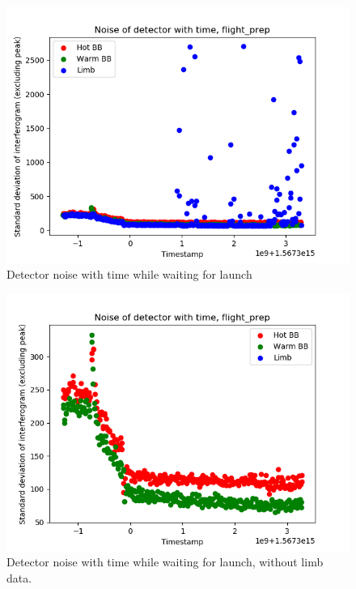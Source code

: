 \begin{figure}
\centering
  \includegraphics[width=0.8\linewidth]{mct_noise_temp_plots/flight_prep_noisevstime_colours.png}
  \caption{Detector noise with time while waiting for launch}
  \label{fig:flightpreptime_noise}
\end{figure}

\begin{figure}
\centering
  \includegraphics[width=0.8\linewidth]{mct_noise_temp_plots/flight_prep_noisevstime_colours_no_limb.png}
  \caption{Detector noise with time while waiting for launch, without limb data.}
  \label{fig:flightpreptime_nolimb_noise}
\end{figure}

